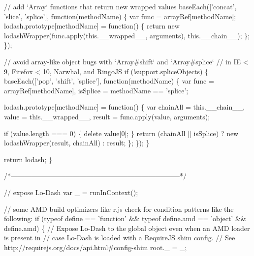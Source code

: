 \begin{DoxyCodeInclude}
    \textcolor{comment}{// add `Array` functions that return new wrapped values}
    baseEach([\textcolor{stringliteral}{'concat'}, \textcolor{stringliteral}{'slice'}, \textcolor{stringliteral}{'splice'}], \textcolor{keyword}{function}(methodName) \{
      var func = arrayRef[methodName];
      lodash.prototype[methodName] = \textcolor{keyword}{function}() \{
        \textcolor{keywordflow}{return} \textcolor{keyword}{new} lodashWrapper(func.apply(\textcolor{keyword}{this}.\_\_wrapped\_\_, arguments), this.\_\_chain\_\_);
      \};
    \});

    \textcolor{comment}{// avoid array-like object bugs with `Array#shift` and `Array#splice`}
    \textcolor{comment}{// in IE < 9, Firefox < 10, Narwhal, and RingoJS}
    \textcolor{keywordflow}{if} (!support.spliceObjects) \{
      baseEach([\textcolor{stringliteral}{'pop'}, \textcolor{stringliteral}{'shift'}, \textcolor{stringliteral}{'splice'}], \textcolor{keyword}{function}(methodName) \{
        var func = arrayRef[methodName],
            isSplice = methodName == \textcolor{stringliteral}{'splice'};

        lodash.prototype[methodName] = \textcolor{keyword}{function}() \{
          var chainAll = this.\_\_chain\_\_,
              value = this.\_\_wrapped\_\_,
              result = func.apply(value, arguments);

          \textcolor{keywordflow}{if} (value.length === 0) \{
            \textcolor{keyword}{delete} value[0];
          \}
          \textcolor{keywordflow}{return} (chainAll || isSplice)
            ? \textcolor{keyword}{new} lodashWrapper(result, chainAll)
            : result;
        \};
      \});
    \}

    \textcolor{keywordflow}{return} lodash;
  \}

  \textcolor{comment}{/*--------------------------------------------------------------------------*/}

  \textcolor{comment}{// expose Lo-Dash}
  var \_ = runInContext();

  \textcolor{comment}{// some AMD build optimizers like r.js check for condition patterns like the following:}
  \textcolor{keywordflow}{if} (typeof define == \textcolor{stringliteral}{'function'} && typeof define.amd == \textcolor{stringliteral}{'object'} && define.amd) \{
    \textcolor{comment}{// Expose Lo-Dash to the global object even when an AMD loader is present in}
    \textcolor{comment}{// case Lo-Dash is loaded with a RequireJS shim config.}
    \textcolor{comment}{// See http://requirejs.org/docs/api.html#config-shim}
    root.\_ = \_;


\end{DoxyCodeInclude}
